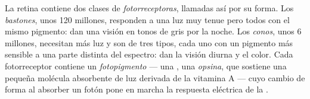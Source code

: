 \begin{definition}[Fotorreceptores]\label{def:g11:the-eye:photoreceptors}
La retina contiene dos clases de 
\emph{fotorreceptoras}, llamadas así por su forma.
Los \emph{bastones}, unos 120 millones,
responden a una luz muy tenue pero todos con el mismo pigmento: dan una
visión en tonos de gris por la noche. Los
\emph{conos}, unos 6 millones, necesitan más luz y
son de tres tipos, cada uno con un pigmento más sensible a una parte
distinta del espectro: dan la visión diurna y el color. Cada
fotorreceptor contiene un \emph{fotopigmento} --- una , una
\emph{opsina}, que sostiene una pequeña molécula
absorbente de luz derivada de la vitamina A --- cuyo cambio de forma al
absorber un fotón pone en marcha la respuesta eléctrica de la .
\end{definition}

